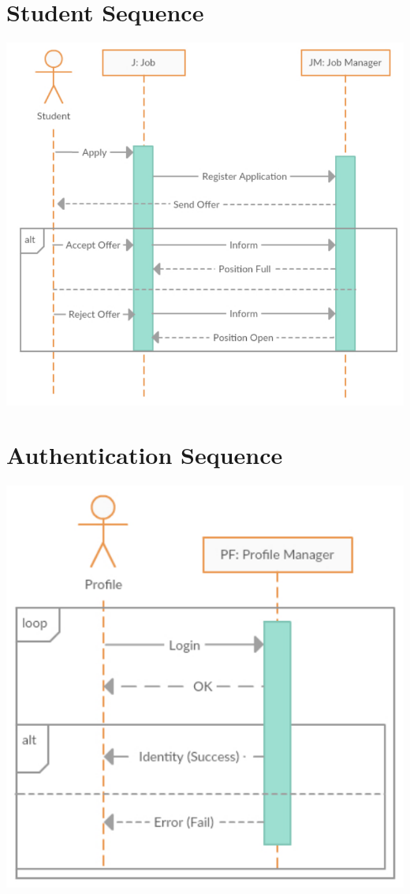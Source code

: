 \documentclass[12pt]{report}
\begin{document}
\section{Student Sequence}
\includegraphics[scale=1.0]{model/Diagrams/Sequence/SeqStudent}
\section{Authentication Sequence}
\includegraphics[scale=0.8]{model/Diagrams/Sequence/SeqAuthentication}
\end{document}
